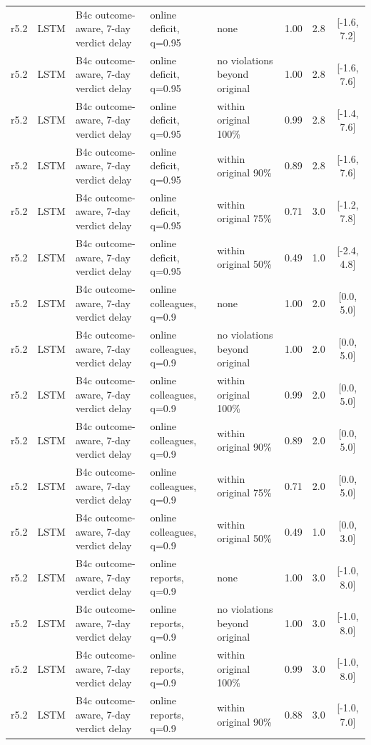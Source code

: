 \begin{longtable}{lllp{4.2cm}p{3.4cm}ccc}
r5.2 & LSTM & B4c outcome-aware, 7-day verdict delay & online deficit, q=0.95 & none & 1.00 & 2.8 & [-1.6, 7.2] \\
r5.2 & LSTM & B4c outcome-aware, 7-day verdict delay & online deficit, q=0.95 & no violations beyond original & 1.00 & 2.8 & [-1.6, 7.6] \\
r5.2 & LSTM & B4c outcome-aware, 7-day verdict delay & online deficit, q=0.95 & within original 100\% & 0.99 & 2.8 & [-1.4, 7.6] \\
r5.2 & LSTM & B4c outcome-aware, 7-day verdict delay & online deficit, q=0.95 & within original 90\% & 0.89 & 2.8 & [-1.6, 7.6] \\
r5.2 & LSTM & B4c outcome-aware, 7-day verdict delay & online deficit, q=0.95 & within original 75\% & 0.71 & 3.0 & [-1.2, 7.8] \\
r5.2 & LSTM & B4c outcome-aware, 7-day verdict delay & online deficit, q=0.95 & within original 50\% & 0.49 & 1.0 & [-2.4, 4.8] \\
r5.2 & LSTM & B4c outcome-aware, 7-day verdict delay & online colleagues, q=0.9 & none & 1.00 & 2.0 & [0.0, 5.0] \\
r5.2 & LSTM & B4c outcome-aware, 7-day verdict delay & online colleagues, q=0.9 & no violations beyond original & 1.00 & 2.0 & [0.0, 5.0] \\
r5.2 & LSTM & B4c outcome-aware, 7-day verdict delay & online colleagues, q=0.9 & within original 100\% & 0.99 & 2.0 & [0.0, 5.0] \\
r5.2 & LSTM & B4c outcome-aware, 7-day verdict delay & online colleagues, q=0.9 & within original 90\% & 0.89 & 2.0 & [0.0, 5.0] \\
r5.2 & LSTM & B4c outcome-aware, 7-day verdict delay & online colleagues, q=0.9 & within original 75\% & 0.71 & 2.0 & [0.0, 5.0] \\
r5.2 & LSTM & B4c outcome-aware, 7-day verdict delay & online colleagues, q=0.9 & within original 50\% & 0.49 & 1.0 & [0.0, 3.0] \\
r5.2 & LSTM & B4c outcome-aware, 7-day verdict delay & online reports, q=0.9 & none & 1.00 & 3.0 & [-1.0, 8.0] \\
r5.2 & LSTM & B4c outcome-aware, 7-day verdict delay & online reports, q=0.9 & no violations beyond original & 1.00 & 3.0 & [-1.0, 8.0] \\
r5.2 & LSTM & B4c outcome-aware, 7-day verdict delay & online reports, q=0.9 & within original 100\% & 0.99 & 3.0 & [-1.0, 8.0] \\
r5.2 & LSTM & B4c outcome-aware, 7-day verdict delay & online reports, q=0.9 & within original 90\% & 0.88 & 3.0 & [-1.0, 7.0] \\

\end{longtable}
